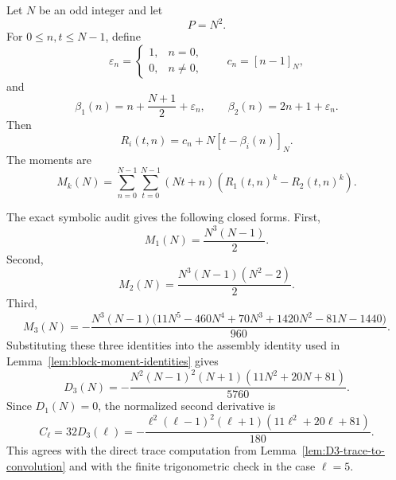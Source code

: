 \documentclass{article}
\theoremstyle{definition}
\numberwithin{equation}{section}
\begin{document}
Let $N$ be an odd integer and let
\begin{equation}
P=N^2.
\end{equation}
For $0\leq n,t\leq N-1$, define
\begin{equation}
\varepsilon_n=
\begin{cases}
1,& n=0,\\
0,& n\neq 0,
\end{cases}
\qquad
c_n=[n-1]_N,
\end{equation}
and
\begin{equation}
\beta_1(n)=n+\frac{N+1}{2}+\varepsilon_n,
\qquad
\beta_2(n)=2n+1+\varepsilon_n.
\end{equation}
Then
\begin{equation}
R_i(t,n)=c_n+N[t-\beta_i(n)]_N.
\end{equation}
The moments are
\begin{equation}
M_k(N)
=
\sum_{n=0}^{N-1}
\sum_{t=0}^{N-1}
(Nt+n)\left(R_1(t,n)^k-R_2(t,n)^k\right).
\end{equation}

The exact symbolic audit gives the following closed forms.  First,
\begin{equation}
M_1(N)=\frac{N^3(N-1)}{2}.
\end{equation}
Second,
\begin{equation}
M_2(N)=\frac{N^3(N-1)(N^2-2)}{2}.
\end{equation}
Third,
\begin{equation}
M_3(N)=
-\frac{N^3(N-1)
\bigl(11N^5-460N^4+70N^3+1420N^2-81N-1440\bigr)}{960}.
\end{equation}
Substituting these three identities into the assembly identity used in Lemma~\ref{lem:block-moment-identities} gives
\begin{equation}
D_3(N)=
-\frac{N^2(N-1)^2(N+1)(11N^2+20N+81)}{5760}.
\end{equation}
Since $D_1(N)=0$, the normalized second derivative is
\begin{equation}
C_\ell
=
32D_3(\ell)
=
-\frac{\ell^2(\ell-1)^2(\ell+1)(11\ell^2+20\ell+81)}{180}.
\end{equation}
This agrees with the direct trace computation from Lemma~\ref{lem:D3-trace-to-convolution} and with the finite trigonometric check in the case $\ell=5$.



\end{document}
